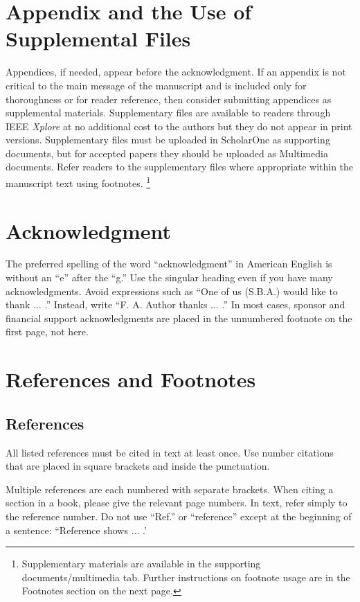 \documentclass[journal,twoside,web]{ieeecolor}
\begin{document}
\section*{Appendix and the Use of Supplemental Files}
Appendices, if needed, appear before the acknowledgment. If an appendix is not
critical to the main message of the manuscript and is included only for thoroughness
or for reader reference, then consider submitting appendices as supplemental materials.
Supplementary files are available to readers through IEEE \emph{Xplore\textregistered}
at no additional cost to the authors but they do not appear in print versions.
Supplementary files must be uploaded in ScholarOne as supporting documents, but for
accepted papers they should be uploaded as Multimedia documents. Refer readers
to the supplementary files where appropriate within the manuscript text using footnotes.
\footnote{Supplementary materials are available in the supporting documents/multimedia tab.
    Further instructions on footnote usage are in the Footnotes section on the next page.}

\section*{Acknowledgment}
The preferred spelling of the word ``acknowledgment'' in American English is
without an ``e'' after the ``g.'' Use the singular heading even if you have
many acknowledgments. Avoid expressions such as ``One of us (S.B.A.) would
like to thank $\ldots$ .'' Instead, write ``F. A. Author thanks $\ldots$ .'' In most
cases, sponsor and financial support acknowledgments are placed in the
unnumbered footnote on the first page, not here.

\section*{References and Footnotes}

\subsection{References}
All listed references must be cited in text at least once. Use number citations
that are placed in square brackets and inside the punctuation.

Multiple references are each numbered with separate brackets.
When citing a section in a book, please give the relevant page numbers.
In text, refer simply to the reference number. Do not use ``Ref.'' or
``reference'' except at the beginning of a sentence:
``Reference \cite{b3} shows $\ldots$ .'
\end{document}
